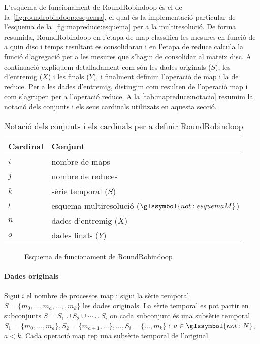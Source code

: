 L'esquema de funcionament de RoundRobindoop és el de
la~\autoref{fig:roundrobindoop:esquema}, el qual és la implementació
particular de l'esquema de la~\autoref{fig:mapreduce:esquema} per a la
multiresolució.  De forma resumida, RoundRobindoop en l'etapa de map
classifica les mesures en funció de a quin disc i temps resultant es
consolidaran i en l'etapa de reduce calcula la funció d'agregació per
a les mesures que s'hagin de consolidar al mateix disc.  A continuació
expliquem detalladament com són les dades originals ($S$), les
d'entremig ($X$) i les finals ($Y$), i finalment definim l'operació de
map i la de reduce. Per a les dades d'entremig, distingim com resulten
de l'operació map i com s'agrupen per a l'operació reduce. A la
\autoref{tab:mapreduce:notacio} resumim la notació dels conjunts i els
seus cardinals utilitzats en aquesta secció.

\begin{table}
  \centering
  \begin{tabular}[bp]{l|l}
    Cardinal & Conjunt \\\hline
    $i$ & nombre de maps  \\
    $j$ & nombre de reduces \\
    $k$ & sèrie temporal ($S$)  \\
    $l$ & esquema multiresolució ($\glssymbol{not:esquemaM}$) \\
    $n$ & dades d'entremig ($X$) \\
    $o$ & dades finals ($Y$)
  \end{tabular}
  \caption{Notació dels conjunts i els cardinals per a definir RoundRobindoop}
  \label{tab:mapreduce:notacio}
\end{table}


\begin{figure}[tp]
  \centering
  
  \caption{Esquema de funcionament de RoundRobindoop}
  \label{fig:roundrobindoop:esquema}
\end{figure}





\paragraph{Dades originals}
Sigui $i$ el nombre de processos map i sigui la sèrie temporal
$S=\{m_0,\dotsc,m_a,\dotsc,,m_k\}$ les dades originals. La sèrie
temporal es pot partir en subconjunts $S=S_1 \cup S_2 \cup \dotsb \cup
S_i$ on cada subconjunt és una subsèrie temporal $S_1 =
\{m_0,\dotsc,m_{a}\}, S_2 = \{m_{a+1},\dotsc\}, \dotsc, S_i =
\{\dotsc,m_{k}\}$ i $a\in \glssymbol{not:N}$, $a < k$.  Cada
operació map rep una subsèrie temporal de l'original.



